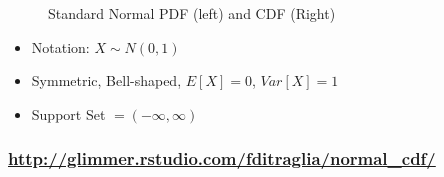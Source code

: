 \documentclass[handout]{beamer}
\begin{document}
\begin{frame}
\begin{figure}[h]
\begin{tabular}{cc}
\end{tabular}
\caption{Standard Normal PDF (left) and CDF (Right)}
\end{figure}
\begin{itemize}
  \item Notation: $X \sim N(0,1)$
  \item Symmetric, Bell-shaped, $E[X]=0$, $Var[X]=1$
  \item Support Set $= (-\infty,\infty)$
\end{itemize}
\end{frame}


\begin{frame}
	\frametitle{\href{http://glimmer.rstudio.com/fditraglia/normal_cdf/}{http://glimmer.rstudio.com/fditraglia/normal\_cdf/}}

\begin{figure}
\end{figure}

\end{frame}
\end{document}
